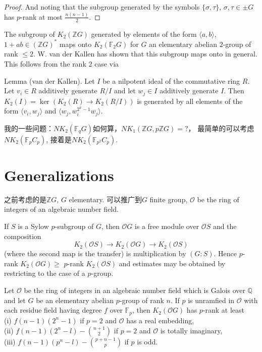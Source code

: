 \begin{proof}
And noting that the subgroup generated by the symbols
$\{\sigma, \tau\}$, $\sigma,\tau \in \pm G$ has $p$-rank at most $\frac{n(n-1)}{2}$.
\end{proof}

\begin{remark}
	The  subgroup of  $K_2(\mathbb{Z} G)$  generated by elements of the form  $ \langle a,b \rangle$,
$1 +ab \in (\mathbb{Z}G)^* $ maps onto $K_2(\mathbb{F}_2 G)$ for $G$ an elementary abelian $2$-group of
rank $\leq 2$. W. van der Kallen has shown that this subgroup maps onto in general. This follows from the rank $2$ case via

Lemma  (van der Kallen).  Let $I$ be a nilpotent ideal of the commutative ring $R$. Let $v_i \in R$ additively generate $R/I$ and let $w_j\in I$ additively generate $I$. Then $K_2(I)=\ker(K_2(R)\longrightarrow K_2(R/I))$ is generated by all elements of the form $\langle v_i , w_j \rangle$ and $\langle w_j, w_i^{2^k-1}w_j \rangle$.
\end{remark}




我的一些问题：$NK_2(\mathbb{F}_q G)$如何算，$NK_1(\mathbb{Z}G,p \mathbb{Z}G)=?$， 最简单的可以考虑$NK_2(\mathbb{F}_p C_p)$, 接着是$NK_2(\mathbb{F}_{p^2} C_p)$.


\section{Generalizations} %
\label{sub:推广和其它}
之前考虑的是$\mathbb{Z}G$, $G$ elementary. 可以推广到$G$ finite group, $\mathcal{O}$ be the ring of integers of an algebraic number field.

If $S$ is a Sylow $p$-subgroup of $G$, then $\mathcal{O}G$ is a free module over $\mathcal{O}S$ and the composition
\[K_2(\mathcal{O}S)\longrightarrow K_2(\mathcal{O}G)\longrightarrow K_2(\mathcal{O}S)\]
(where the second map is the transfer) is multiplication by $(G:S)$. Hence
$p$-rank  $K_2(\mathcal{O}G) \geq$ $p$-rank $K_2(\mathcal{O}S)$  and estimates may be obtained by restricting to the case of a $p$-group. 
\begin{theorem}
	 Let $\mathcal{O}$ be the ring of integers in an algebraic number field which is
Galois over $\mathbb{Q}$ and let $G$ be an elementary abelian $p$-group of rank $n$. If $p$ is unramfied in $\mathcal{O}$ with each residue field having degree $f$ over $\mathbb{F}_p$, then $K_2 (\mathcal{O}G)$ has $p$-rank at least\\
(i)  $f(n - 1) (2^n - 1)$ if $p = 2$  and $\mathcal{O}$ has a real embedding,\\
(ii)  $f(n-1)(2^n- l)-\binom{n+1}{2}$ if $p=2$ and $\mathcal{O}$ is totally imaginary,\\
(iii)  $f(n-1)(p^n-l)-  \binom{p+n-1}{p}$ if $p$ is odd.
\end{theorem}

